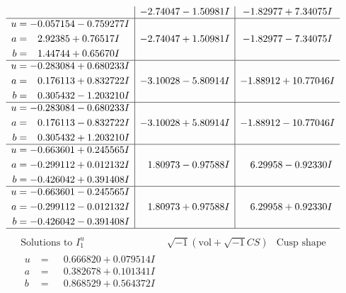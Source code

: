 \documentclass[1p]{elsarticle_modified}
\theoremstyle{definition}
\newcommand{\I}{\sqrt{-1}}
\begin{document}
$$\begin{array}{c|c|c}
 & -2.74047 - 1.50981 I & -1.82977 + 7.34075 I \\ \hline\begin{aligned}
u &= -0.057154 - 0.759277 I \\
a &= \phantom{-}2.92385 + 0.76517 I \\
b &= \phantom{-}1.44744 + 0.65670 I\end{aligned}
 & -2.74047 + 1.50981 I & -1.82977 - 7.34075 I \\ \hline\begin{aligned}
u &= -0.283084 + 0.680233 I \\
a &= \phantom{-}0.176113 + 0.832722 I \\
b &= \phantom{-}0.305432 - 1.203210 I\end{aligned}
 & -3.10028 - 5.80914 I & -1.88912 + 10.77046 I \\ \hline\begin{aligned}
u &= -0.283084 - 0.680233 I \\
a &= \phantom{-}0.176113 - 0.832722 I \\
b &= \phantom{-}0.305432 + 1.203210 I\end{aligned}
 & -3.10028 + 5.80914 I & -1.88912 - 10.77046 I \\ \hline\begin{aligned}
u &= -0.663601 + 0.245565 I \\
a &= -0.299112 + 0.012132 I \\
b &= -0.426042 + 0.391408 I\end{aligned}
 & \phantom{-}1.80973 - 0.97588 I & \phantom{-}6.29958 - 0.92330 I \\ \hline\begin{aligned}
u &= -0.663601 - 0.245565 I \\
a &= -0.299112 - 0.012132 I \\
b &= -0.426042 - 0.391408 I\end{aligned}
 & \phantom{-}1.80973 + 0.97588 I & \phantom{-}6.29958 + 0.92330 I\\
 \hline 
 \end{array}$$\newpage$$\begin{array}{c|c|c}  
\text{Solutions to }I^u_{1}& \I (\text{vol} + \sqrt{-1}CS) & \text{Cusp shape}\\
 \hline 
\begin{aligned}
u &= \phantom{-}0.666820 + 0.079514 I \\
a &= \phantom{-}0.382678 + 0.101341 I \\
b &= \phantom{-}0.868529 + 0.564372 I\end{aligned}

\end{array}$$
\end{document}
